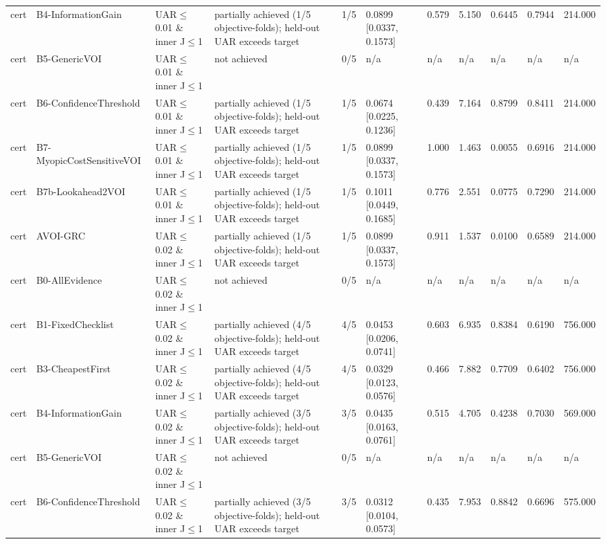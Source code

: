 \begin{table}[!ht]
{\begin{tabular}{lllllllllll}
cert & B4-InformationGain & UAR$\le$0.01 \& inner J$\le$1 & partially achieved (1/5 objective-folds); held-out UAR exceeds target & 1/5 & 0.0899 [0.0337, 0.1573] & 0.579 & 5.150 & 0.6445 & 0.7944 & 214.000 \\
cert & B5-GenericVOI & UAR$\le$0.01 \& inner J$\le$1 & not achieved & 0/5 & n/a & n/a & n/a & n/a & n/a & n/a \\
cert & B6-ConfidenceThreshold & UAR$\le$0.01 \& inner J$\le$1 & partially achieved (1/5 objective-folds); held-out UAR exceeds target & 1/5 & 0.0674 [0.0225, 0.1236] & 0.439 & 7.164 & 0.8799 & 0.8411 & 214.000 \\
cert & B7-MyopicCostSensitiveVOI & UAR$\le$0.01 \& inner J$\le$1 & partially achieved (1/5 objective-folds); held-out UAR exceeds target & 1/5 & 0.0899 [0.0337, 0.1573] & 1.000 & 1.463 & 0.0055 & 0.6916 & 214.000 \\
cert & B7b-Lookahead2VOI & UAR$\le$0.01 \& inner J$\le$1 & partially achieved (1/5 objective-folds); held-out UAR exceeds target & 1/5 & 0.1011 [0.0449, 0.1685] & 0.776 & 2.551 & 0.0775 & 0.7290 & 214.000 \\
cert & AVOI-GRC & UAR$\le$0.02 \& inner J$\le$1 & partially achieved (1/5 objective-folds); held-out UAR exceeds target & 1/5 & 0.0899 [0.0337, 0.1573] & 0.911 & 1.537 & 0.0100 & 0.6589 & 214.000 \\
cert & B0-AllEvidence & UAR$\le$0.02 \& inner J$\le$1 & not achieved & 0/5 & n/a & n/a & n/a & n/a & n/a & n/a \\
cert & B1-FixedChecklist & UAR$\le$0.02 \& inner J$\le$1 & partially achieved (4/5 objective-folds); held-out UAR exceeds target & 4/5 & 0.0453 [0.0206, 0.0741] & 0.603 & 6.935 & 0.8384 & 0.6190 & 756.000 \\
cert & B3-CheapestFirst & UAR$\le$0.02 \& inner J$\le$1 & partially achieved (4/5 objective-folds); held-out UAR exceeds target & 4/5 & 0.0329 [0.0123, 0.0576] & 0.466 & 7.882 & 0.7709 & 0.6402 & 756.000 \\
cert & B4-InformationGain & UAR$\le$0.02 \& inner J$\le$1 & partially achieved (3/5 objective-folds); held-out UAR exceeds target & 3/5 & 0.0435 [0.0163, 0.0761] & 0.515 & 4.705 & 0.4238 & 0.7030 & 569.000 \\
cert & B5-GenericVOI & UAR$\le$0.02 \& inner J$\le$1 & not achieved & 0/5 & n/a & n/a & n/a & n/a & n/a & n/a \\
cert & B6-ConfidenceThreshold & UAR$\le$0.02 \& inner J$\le$1 & partially achieved (3/5 objective-folds); held-out UAR exceeds target & 3/5 & 0.0312 [0.0104, 0.0573] & 0.435 & 7.953 & 0.8842 & 0.6696 & 575.000 \\

\end{tabular}}
\end{table}
